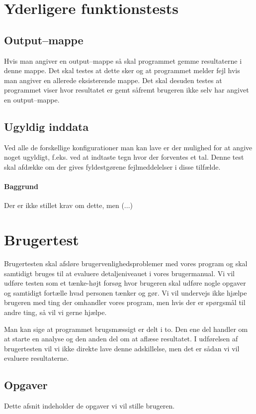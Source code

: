 \documentclass[a4paper,oneside,article]{memoir}
\begin{document}
\chapter{Yderligere funktionstests}

\section{Output--mappe}
Hvis man angiver en output--mappe så skal programmet gemme
resultaterne i denne mappe. Det skal testes at dette sker og at
programmet melder fejl hvis man angiver en allerede eksisterende
mappe. Det skal desuden testes at programmet viser hvor resultatet er
gemt såfremt brugeren ikke selv har angivet en output--mappe.

\section{Ugyldig inddata}
Ved alle de forskellige konfigurationer man kan lave er der mulighed
for at angive noget ugyldigt, f.eks. ved at indtaste tegn hvor der
forventes et tal. Denne test skal afdække om der gives fyldestgørene
fejlmeddelelser i disse tilfælde.



\subsubsection{Baggrund}
Der er ikke stillet krav om dette, men (...)

\chapter{Brugertest}
Brugertesten skal afsløre brugervenlighedsproblemer med vores program
og skal samtidigt bruges til at evaluere detaljeniveauet i vores
brugermanual. Vi vil udføre testen som et tænke-højt forsøg hvor
brugeren skal udføre nogle opgaver og samtidigt fortælle hvad personen
tænker og gør. Vi vil undervejs ikke hjælpe brugeren med ting der
omhandler vores program, men hvis der er spørgsmål til andre ting, så
vil vi gerne hjælpe.

Man kan sige at programmet brugsmæssigt er delt i to. Den ene del
handler om at starte en analyse og den anden del om at aflæse
resultatet. I udførelsen af brugertesten vil vi ikke direkte lave
denne adskillelse, men det er sådan vi vil evaluere resultaterne.
\newpage
\section{Opgaver}
Dette afsnit indeholder de opgaver vi vil stille brugeren.
\end{document}

